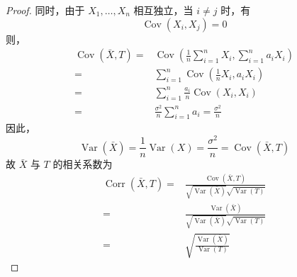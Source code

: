 \documentclass[normal,cn]{elegantnote}
\begin{document}
\begin{enumerate}
\begin{proof}
            同时，由于 $X_{1},\ldots,X_{n}$ 相互独立，当 $i\neq j$ 时，有
            \begin{equation*}
                \operatorname{Cov}\left(X_{i},X_{j}\right)=0
            \end{equation*}
            则，
            \begin{equation*}
                \begin{aligned}
                    \operatorname{Cov}(\bar{X},T)= & \operatorname{Cov}\left(\frac{1}{n}\sum_{i=1}^{n}X_{i},\sum_{i=1}^{n}a_{i}X_{i}\right) \\
                    =                              & \sum_{i=1}^{n}\operatorname{Cov}\left(\frac{1}{n}X_{i},a_{i}X_{i}\right)               \\
                    =                              & \sum_{i=1}^{n}\frac{a_{i}}{n}\operatorname{Cov}\left(X_{i},X_{i}\right)                \\
                    =                              & \frac{\sigma^{2}}{n}\sum_{i=1}^{n}a_{i}=\frac{\sigma^{2}}{n}
                \end{aligned}
            \end{equation*}
            因此，
            \begin{equation*}
                \operatorname{Var}(\bar{X})=\frac{1}{n}\operatorname{Var}(X)=\frac{\sigma^{2}}{n}=\operatorname{Cov}(\bar{X},T)
            \end{equation*}
            故 $\bar{X}$ 与 $T$ 的相关系数为
            \begin{equation*}
                \begin{aligned}
                    \operatorname{Corr}(\bar{X},T)= & \frac{\operatorname{Cov}(\bar{X},T)}{\sqrt{\operatorname{Var}(\bar{X})}\sqrt{\operatorname{Var}(T)}} \\
                    =                               & \frac{\operatorname{Var}(\bar{X})}{\sqrt{\operatorname{Var}(\bar{X})}\sqrt{\operatorname{Var}(T)}}   \\
                    =                               & \sqrt{\frac{\operatorname{Var}(\bar{X})}{\operatorname{Var}(T)}}
                \end{aligned}
            \end{equation*}
        \end{proof}
\end{enumerate}
\end{document}
